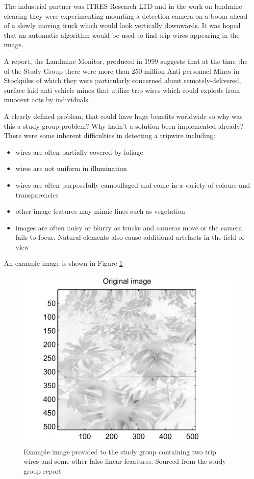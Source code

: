 \documentclass[11pt]{article} %
\begin{document}
The industrial partner was ITRES Research LTD and in the work on landmine clearing they were experimenting mounting a detection camera on a boom ahead of a slowly moving truck which would look vertically downwards. It was hoped that an automatic algorithm would be used to find trip wires appearing in the image. 
	
	A report, the Landmine Monitor, produced in 1999 \cite{landmine} suggests that at the time the of the Study Group there were more than 250 million Anti-personnel Mines in Stockpiles of which they were particularly concerned about remotely-delivered, surface laid anti vehicle mines that utilize trip wires which could explode from innocent acts by individuals. 
	
	A clearly defined  problem, that could have huge benefits worldwide so why was this a study group problem? Why hadn't a solution been implemented already? There were some inherent difficulties in detecting a tripwire including:
	\begin{itemize}
	\item wires are often partially covered by foliage
	\item wires are not uniform in illumination 
	\item wires are often purposefully camouflaged and come in a variety of colours and transparencies
	\item other image features may mimic lines such as vegetation 
	\item images are often noisy or blurry as trucks and cameras move or the camera fails to focus. Natural elements also cause additional artefacts in the field of view
	\end{itemize}
	An example image is shown in Figure \ref{fig:landmine-image}
	
	\begin{figure}
		\centering
		\includegraphics[width=0.7\linewidth]{"Report_images/landmine image"}
		\caption{Example image provided to the study group containing two trip wires and some other false linear feaatures. Sourced from the study group report \cite{Jessop}}
		\label{fig:landmine-image}
	\end{figure}
	
\end{document}
